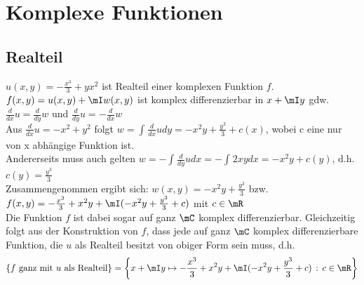 
	\section{Komplexe Funktionen}

	\subsection{Realteil}
	$u(x,y)=-\frac{x^3}{3}+y x^2 $ ist Realteil einer komplexen Funktion $f$.\\
	$f(x,y)=u(x,y)+\mI w(x,y)$ ist komplex differenzierbar in $x+\mI y$ gdw. $\frac{d}{dx}u = \frac{d}{dy}w$ und $\frac{d}{dy}u = -\frac{d}{dx}w$\\
	Aus $\frac{d}{dx}u = -x^2+y^2$ folgt $w=\int_{}{} \frac{d}{dx} u dy =-x^2y+\frac{y^3}{3}+c(x)$, wobei c eine nur von x abhängige Funktion ist.\\
    Andererseits muss auch gelten $w=-\int_{}{} \frac{d}{dy} u dx= -\int_{}{} 2xy  dx =-x^2y+c(y)$, d.h. $c(y)=\frac{y^3}{3}$\\
	Zusammengenommen ergibt sich:
	    $w(x,y)=-x^2y+\frac{y^3}{3}$ bzw. $f(x,y)=-\frac{x^3}{3}+ x^2y +\mI(-x^2y+\frac{y^3}{3}+c)$ mit $c\in\mR$\\
Die Funktion $f$ ist dabei sogar auf ganz $\mC$ komplex differenzierbar. Gleichzeitig folgt aus der Konstruktion von $f$, dass jede auf ganz $\mC$ komplex differenzierbare Funktion, die $u$ als Realteil besitzt von obiger Form sein muss, d.h.
\begin{equation*}
\left\{f\text{ ganz mit }u\text{ als Realteil}\right\}=\left\{x+\mI y\mapsto-\frac{x^3}{3}+x^2y+\mI(-x^2y+\frac{y^3}{3}+c)\,:\,c\in\mR\right\}
\end{equation*}

